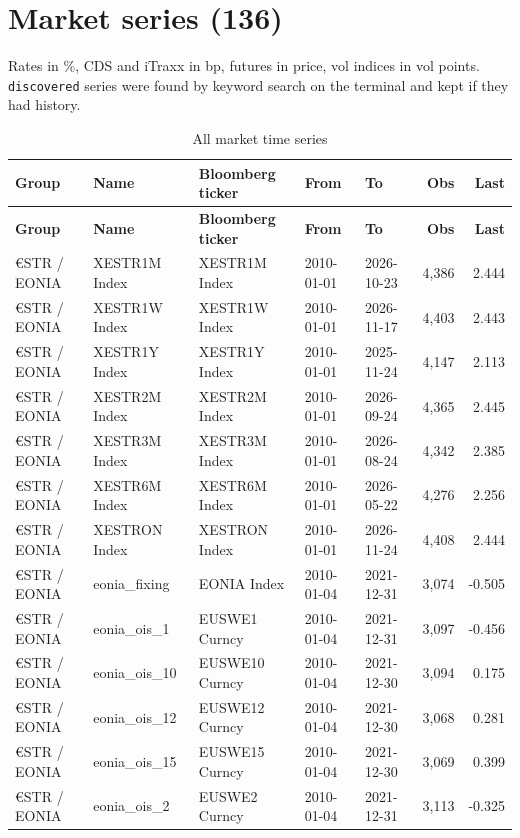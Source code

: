 \documentclass[10pt,a4paper]{article}
\begin{document}
\section*{Market series (136)}
Rates in \%, CDS and iTraxx in bp, futures in price, vol indices in vol points. \texttt{discovered} series were found by keyword
search on the terminal and kept if they had history.
{\footnotesize\begin{longtable}{lllllrr}
\caption{All market time series}\\ \toprule \textbf{Group} & \textbf{Name} & \textbf{Bloomberg ticker} & \textbf{From} & \textbf{To} & \textbf{Obs} & \textbf{Last} \\ \midrule \endfirsthead
\toprule \textbf{Group} & \textbf{Name} & \textbf{Bloomberg ticker} & \textbf{From} & \textbf{To} & \textbf{Obs} & \textbf{Last} \\ \midrule \endhead
€STR / EONIA & XESTR1M Index & XESTR1M Index & 2010-01-01 & 2026-10-23 & 4,386 & 2.444 \\
€STR / EONIA & XESTR1W Index & XESTR1W Index & 2010-01-01 & 2026-11-17 & 4,403 & 2.443 \\
€STR / EONIA & XESTR1Y Index & XESTR1Y Index & 2010-01-01 & 2025-11-24 & 4,147 & 2.113 \\
€STR / EONIA & XESTR2M Index & XESTR2M Index & 2010-01-01 & 2026-09-24 & 4,365 & 2.445 \\
€STR / EONIA & XESTR3M Index & XESTR3M Index & 2010-01-01 & 2026-08-24 & 4,342 & 2.385 \\
€STR / EONIA & XESTR6M Index & XESTR6M Index & 2010-01-01 & 2026-05-22 & 4,276 & 2.256 \\
€STR / EONIA & XESTRON Index & XESTRON Index & 2010-01-01 & 2026-11-24 & 4,408 & 2.444 \\
€STR / EONIA & eonia\_fixing & EONIA Index & 2010-01-04 & 2021-12-31 & 3,074 & -0.505 \\
€STR / EONIA & eonia\_ois\_1 & EUSWE1 Curncy & 2010-01-04 & 2021-12-31 & 3,097 & -0.456 \\
€STR / EONIA & eonia\_ois\_10 & EUSWE10 Curncy & 2010-01-04 & 2021-12-30 & 3,094 & 0.175 \\
€STR / EONIA & eonia\_ois\_12 & EUSWE12 Curncy & 2010-01-04 & 2021-12-30 & 3,068 & 0.281 \\
€STR / EONIA & eonia\_ois\_15 & EUSWE15 Curncy & 2010-01-04 & 2021-12-30 & 3,069 & 0.399 \\
€STR / EONIA & eonia\_ois\_2 & EUSWE2 Curncy & 2010-01-04 & 2021-12-31 & 3,113 & -0.325 \\

\end{longtable}}
\end{document}
